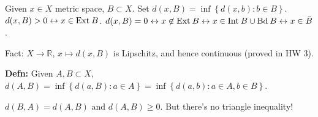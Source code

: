 \documentclass[10pt,letterpaper]{article}
\newcommand{\n}{\hfill\break}
\newcommand{\defn}[1]{\par\noindent\settowidth{\hangindent}{\textbf{Defn: }}\textbf{Defn: }#1\n}
\newcommand{\ptxt}[1]{\textrm{\textnormal{#1}}}
\newcommand{\set}[1]{\left\{#1\right\}}
\newcommand{\reals}{\mathbb{R}}
\newcommand{\R}{\reals}
\newcommand{\closure}[1]{\bar{#1}}
\newcommand{\Int}{\ptxt{Int}\>}
\newcommand{\Ext}{\ptxt{Ext}\>}
\newcommand{\Bd}{\ptxt{Bd}\>}
\begin{document}
\par\noindent Given $x\in{}X$ metric space, $B\subset{}X$.\n
Set $d(x,B)=\inf\set{d(x,b):b\in{}B}$.\n
$d(x,B)>0\leftrightarrow{}x\in\Ext{}B$.\n
$d(x,B)=0\leftrightarrow{}x\not\in\Ext{}B\leftrightarrow{}x\in\Int{}B\cup\Bd{}B\leftrightarrow{}x\in\closure{B}$.\n

\par\noindent Fact: $X\to\R$, $x\mapsto{}d(x,B)$ is Lipschitz, and hence continuous (proved in HW 3).\n

\defn{Given $A,B\subset{}X$, $d(A,B)=\inf\set{d(a,B):a\in{}A}=\inf\set{d(a,b):a\in{}A,b\in{}B}$.}

\par\noindent $d(B,A)=d(A,B)$ and $d(A,B)\ge{}0$. But there's no triangle inequality!
\end{document}
